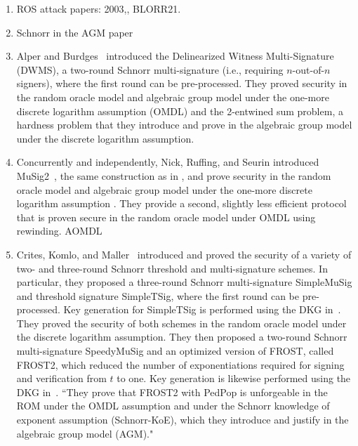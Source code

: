 \begin{enumerate}
\item ROS attack papers: 2003,\cite{cryptoeprint:2018/417,DrijversEFKLNS19}, BLORR21. 
\item Schnorr in the AGM paper
\item Alper and Burdges~\cite{AlperB21} introduced the Delinearized Witness Multi-Signature (DWMS), a two-round Schnorr multi-signature (i.e., requiring $n$-out-of-$n$ signers), where the first round can be pre-processed.  They proved security in the random oracle model and algebraic group model under the one-more discrete logarithm assumption (OMDL) and the 2-entwined sum problem, a hardness problem that they introduce and prove in the algebraic group model under the discrete logarithm assumption.
\item Concurrently and independently, Nick, Ruffing, and Seurin introduced MuSig2~\cite{NickRS21}, the same construction as in \cite{AlperB21}, and prove security in the random oracle model and algebraic group model under the one-more discrete logarithm assumption .  They provide a second, slightly less efficient protocol that is proven secure in the random oracle model under OMDL using rewinding.
AOMDL

\item Crites, Komlo, and Maller~\cite{CritesKM21} introduced and proved the security of a variety of two- and three-round Schnorr threshold and multi-signature schemes.  In particular, they proposed a three-round Schnorr multi-signature SimpleMuSig and threshold signature SimpleTSig, where the first round can be pre-processed.  Key generation for SimpleTSig is performed using the DKG in~\cite{KomloG20}.  They proved the security of both schemes in the random oracle model under the discrete logarithm assumption.   They then proposed a two-round Schnorr multi-signature SpeedyMuSig and an optimized version of FROST, called FROST2, which reduced the number of exponentiations required for signing and verification from $t$ to one.  Key generation is likewise performed using the DKG in~\cite{KomloG20}.
``They prove that FROST2 with PedPop is unforgeable in the ROM under the OMDL assumption and under the Schnorr
knowledge of exponent assumption (Schnorr-KoE), which they introduce and justify in the algebraic group model (AGM)."


\end{enumerate}
